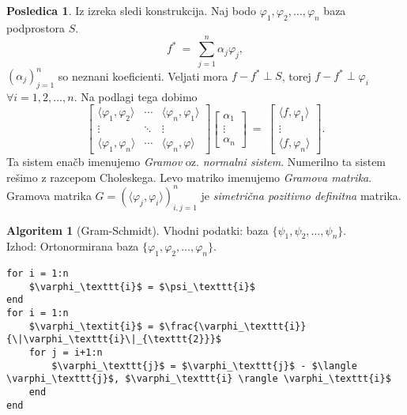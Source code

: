 \documentclass[11pt]{article}
\theoremstyle{definition}
\theoremstyle{definition}
\newtheorem*{algoritem}{Algoritem}
\newtheorem*{posledica}{Posledica}
\begin{document}
\begin{posledica}

Iz izreka sledi konstrukcija. Naj bodo $\varphi_1, \varphi_2, \ldots, \varphi_n$ baza podprostora $S$. 
$$f^* ~=~ \sum_{j=1}^n \alpha_j \varphi_j,$$ 
$(\alpha_j)_{j=1}^n$ so neznani koeficienti. Veljati mora $f - f^* \perp S$, torej $f - f^* \perp \varphi_i$ $\forall i = 1, 2, \ldots, n$. Na podlagi tega dobimo
$$\begin{bmatrix}
\langle \varphi_1, \varphi_2 \rangle & \cdots & \langle \varphi_n, \varphi_1 \rangle \\
\vdots & \ddots & \vdots \\
\langle \varphi_1, \varphi_n \rangle & \cdots & \langle \varphi_n, \varphi \rangle
\end{bmatrix} \begin{bmatrix}
\alpha_1 \\
\vdots \\
\alpha_n
\end{bmatrix} ~=~ \begin{bmatrix}
\langle f, \varphi_1 \rangle \\
\vdots \\
\langle f, \varphi_n \rangle
\end{bmatrix}.$$
Ta sistem enačb imenujemo \textit{Gramov} oz. \textit{normalni sistem}. Numerilno ta sistem rešimo z razcepom Choleskega. Levo matriko imenujemo \textit{Gramova matrika}. Gramova matrika $G = (\langle \varphi_j, \varphi_i \rangle)_{i,j=1}^n$ je \textit{simetrična pozitivno definitna} matrika.

\end{posledica}
\vspace{0.5cm}

\pagebreak

\begin{algoritem}[Gram-Schmidt]

Vhodni podatki: baza $\{\psi_1, \psi_2, \ldots, \psi_n\}$. \\
Izhod: Ortonormirana baza $\{\varphi_1, \varphi_2, \ldots, \varphi_n\}$.
\begin{lstlisting}
for i = 1:n
	$\varphi_\texttt{i}$ = $\psi_\texttt{i}$
end
for i = 1:n
	$\varphi_\textit{i}$ = $\frac{\varphi_\texttt{i}}{\|\varphi_\texttt{i}\|_{\texttt{2}}}$
	for j = i+1:n
		$\varphi_\texttt{j}$ = $\varphi_\texttt{j}$ - $\langle \varphi_\texttt{j}$, $\varphi_\texttt{i} \rangle \varphi_\texttt{i}$
	end
end
\end{lstlisting}

\end{algoritem}
\vspace{0.5cm}

\end{document}
